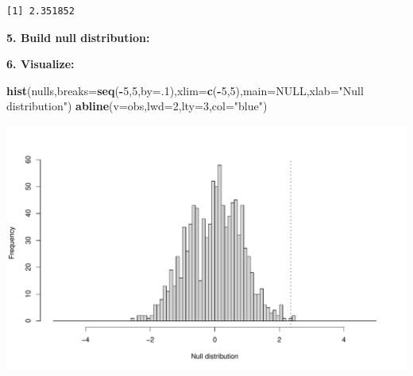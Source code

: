 \documentclass[
]{book}
\newenvironment{Shaded}{\begin{snugshade}}{\end{snugshade}}
\newcommand{\ControlFlowTok}[1]{\textcolor[rgb]{0.13,0.29,0.53}{\textbf{#1}}}
\newcommand{\DataTypeTok}[1]{\textcolor[rgb]{0.13,0.29,0.53}{#1}}
\newcommand{\DecValTok}[1]{\textcolor[rgb]{0.00,0.00,0.81}{#1}}
\newcommand{\KeywordTok}[1]{\textcolor[rgb]{0.13,0.29,0.53}{\textbf{#1}}}
\newcommand{\NormalTok}[1]{#1}
\newcommand{\OperatorTok}[1]{\textcolor[rgb]{0.81,0.36,0.00}{\textbf{#1}}}
\newcommand{\OtherTok}[1]{\textcolor[rgb]{0.56,0.35,0.01}{#1}}
\newcommand{\StringTok}[1]{\textcolor[rgb]{0.31,0.60,0.02}{#1}}
\begin{document}
\begin{verbatim}
[1] 2.351852
\end{verbatim}

\textbf{5. Build null distribution:}

\begin{Shaded}
\end{Shaded}

\textbf{6. Visualize:}

\begin{Shaded}
\begin{Highlighting}[]
\KeywordTok{hist}\NormalTok{(nulls,}\DataTypeTok{breaks=}\KeywordTok{seq}\NormalTok{(}\OperatorTok{-}\DecValTok{5}\NormalTok{,}\DecValTok{5}\NormalTok{,}\DataTypeTok{by=}\NormalTok{.}\DecValTok{1}\NormalTok{),}\DataTypeTok{xlim=}\KeywordTok{c}\NormalTok{(}\OperatorTok{-}\DecValTok{5}\NormalTok{,}\DecValTok{5}\NormalTok{),}\DataTypeTok{main=}\OtherTok{NULL}\NormalTok{,}\DataTypeTok{xlab=}\StringTok{"Null distribution"}\NormalTok{)}
\KeywordTok{abline}\NormalTok{(}\DataTypeTok{v=}\NormalTok{obs,}\DataTypeTok{lwd=}\DecValTok{2}\NormalTok{,}\DataTypeTok{lty=}\DecValTok{3}\NormalTok{,}\DataTypeTok{col=}\StringTok{"blue"}\NormalTok{)}
\end{Highlighting}
\end{Shaded}

\includegraphics{figures/unnamed-chunk-294-1.pdf}
\end{document}
